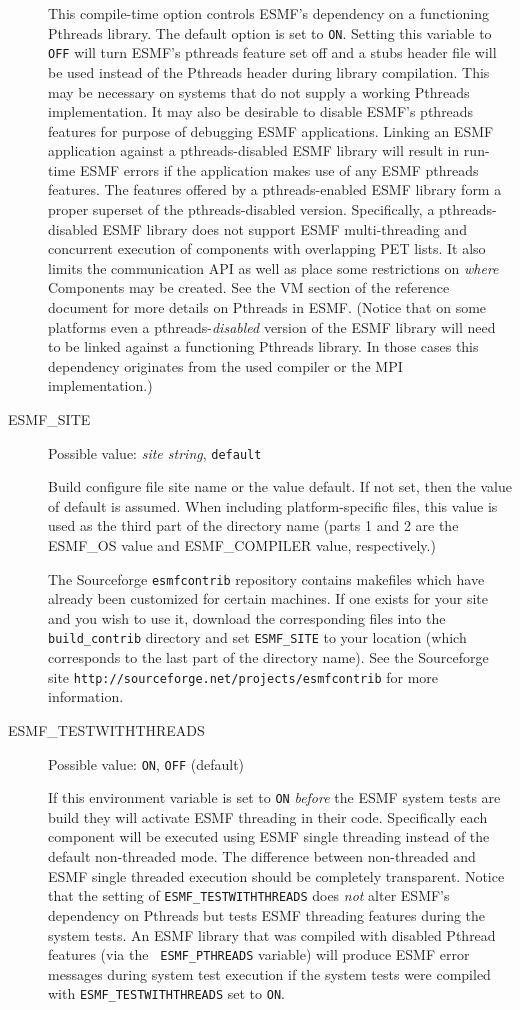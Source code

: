 \begin{description}
This compile-time option controls ESMF's dependency on a functioning
Pthreads library. The default option is set to {\tt ON}. Setting this
variable to {\tt OFF} will turn ESMF's pthreads feature set off and a
stubs header file will be used instead of the Pthreads header during
library compilation. This may be necessary on systems that do not
supply a working Pthreads implementation. It may also be desirable to
disable ESMF's pthreads features for purpose of debugging ESMF
applications. Linking an ESMF application against a pthreads-disabled
ESMF library will result in run-time ESMF errors if the application
makes use of any ESMF pthreads features. The features offered by a
pthreads-enabled ESMF library form a proper superset of the
pthreads-disabled version. Specifically, a pthreads-disabled ESMF
library does not support ESMF multi-threading and concurrent execution
of components with overlapping PET lists. It also limits the
communication API as well as place some restrictions on {\em where}
Components may be created. See the VM section of the reference
document for more details on Pthreads in ESMF. (Notice that on some
platforms even a pthreads-{\em disabled} version of the ESMF library
will need to be linked against a functioning Pthreads library. In
those cases this dependency originates from the used compiler or the
MPI implementation.)

\item[ESMF\_SITE]
Possible value: {\em site string}, {\tt default}

Build configure file site name or the value default. If not set, then the value
of default is assumed. When including platform-specific files, this value is 
used as the third part of the directory name (parts 1 and 2 are the
ESMF\_OS value and ESMF\_COMPILER value, respectively.)

The Sourceforge {\tt esmfcontrib} repository contains makefiles which have 
already been customized for certain machines.  If one exists for your site 
and you wish to use it, download the corresponding files into the 
{\tt build\_contrib} directory and set {\tt ESMF\_SITE} to your location
(which corresponds to the last part of the directory name).  See the 
Sourceforge site {\tt http://sourceforge.net/projects/esmfcontrib} for more 
information.

\item[ESMF\_TESTWITHTHREADS]
Possible value: {\tt ON}, {\tt OFF} (default)

If this environment variable is set to {\tt ON} {\em before} the ESMF system
tests are build they will activate ESMF threading in their code. Specifically
each component will be executed using ESMF single threading instead of the
default non-threaded mode. The difference between non-threaded and ESMF
single threaded execution should be completely transparent. Notice that the
setting of {\tt ESMF\_TESTWITHTHREADS} does {\em not} alter ESMF's dependency
on Pthreads but tests ESMF threading features during the system tests. An
ESMF library that was compiled with disabled Pthread features (via the {\tt
ESMF\_PTHREADS} variable) will produce ESMF error messages during system test
execution if the system tests were compiled with {\tt ESMF\_TESTWITHTHREADS}
set to {\tt ON}.


\end{description}
